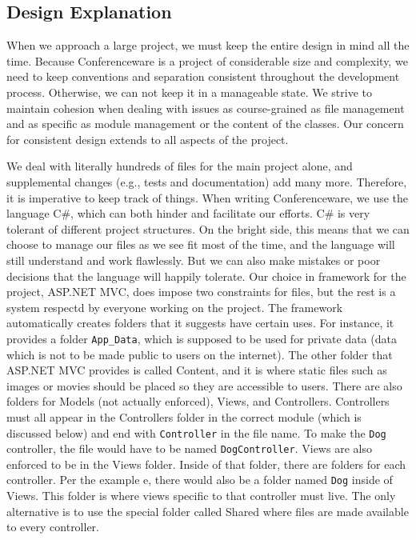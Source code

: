 \documentclass[12pt]{article}
\begin{document}
\newpage

\subsection{Design Explanation}

When we approach a large project, we must keep the entire design in mind all the time. Because Conferenceware is a project of considerable size and complexity, we need to keep conventions and separation consistent throughout the development process. Otherwise, we can not keep it 
in a manageable state. We strive to maintain cohesion when dealing with issues as course-grained as file management and as specific as module management or the content of the classes.  Our concern for consistent design extends to all aspects of the project.

We deal with literally hundreds of files for the main project alone, and supplemental changes (e.g., tests and documentation) add many more. Therefore, it is imperative to keep track of things. When writing Conferenceware, we use the language C\#, which can both hinder and facilitate our efforts.  C\# is very tolerant of different project structures. On the bright side, this means that we can choose to manage our files as we see fit most of the time, and the language will still understand and work flawlessly. But we can also make mistakes or poor decisions that the language will happily tolerate. Our choice in framework for the project, ASP.NET MVC, does impose two constraints for files, but the rest is a system respectd by everyone working on the project. The framework automatically creates folders that it suggests have certain uses. For instance, it provides a folder \texttt{App\_Data}, which is supposed to be used for private data (data which is not to be made
public to users on the internet).  The other folder that ASP.NET MVC provides is called Content, and it is where static files such as images or movies should be placed so they are accessible to users. There are also folders for Models (not actually enforced), Views, and Controllers. Controllers must all appear in the Controllers folder in the correct module (which is discussed below) and end with \texttt{Controller} in the file name. To make the \texttt{Dog} controller, the file would have to be named \texttt{DogController}. Views are also enforced to be in the Views folder. Inside of that folder, there are folders for each controller. Per the example e, there would also be a folder named \texttt{Dog} inside of Views. This folder is where views specific to that controller must live. The only alternative is to use the special folder called Shared where files are made available to every controller.
\end{document}
